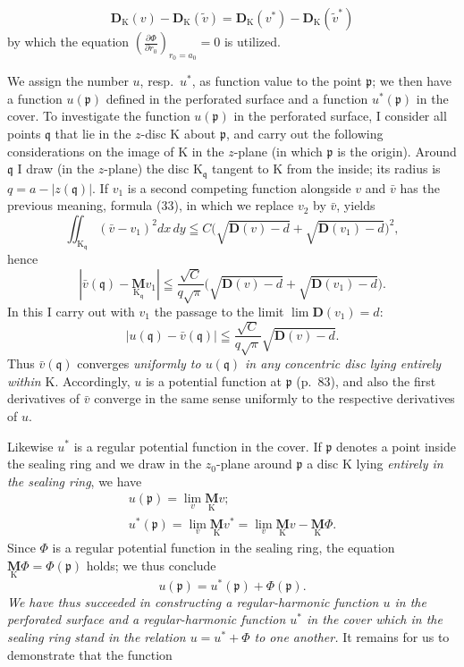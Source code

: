 \documentclass{article}
\begin{document}
\[ \mathbf{D}_{\mathrm{K}}(v) - \mathbf{D}_{\mathrm{K}}(\tilde{v}) = \mathbf{D}_{\mathrm{K}}(v^*) - \mathbf{D}_{\mathrm{K}}(\tilde{v}^*) \]
by which the equation $\left(\frac{\partial\Phi}{\partial r_0}\right)_{r_0 = a_0} = 0$ is utilized.

We assign the number $u$, resp.\ $u^*$, as function value to the point $\mathfrak{p}$; we then have a function $u(\mathfrak{p})$ defined in the perforated surface and a function $u^*(\mathfrak{p})$ in the cover. To investigate the function $u(\mathfrak{p})$ in the perforated surface, I consider all points $\mathfrak{q}$ that lie in the $z$-disc $\mathrm{K}$ about $\mathfrak{p}$, and carry out the following considerations on the image of $\mathrm{K}$ in the $z$-plane (in which $\mathfrak{p}$ is the origin). Around $\mathfrak{q}$ I draw (in the $z$-plane) the disc $\mathrm{K}_\mathfrak{q}$ tangent to $\mathrm{K}$ from the inside; its radius is $q = a - |z(\mathfrak{q})|$. If $v_1$ is a second competing function alongside $v$ and $\bar{v}$ has the previous meaning, formula (33), in which we replace $v_2$ by $\bar{v}$, yields
\[ \iint_{\mathrm{K}_\mathfrak{q}} (\bar{v} - v_1)^2 dx\,dy \leqq C \bigl( \sqrt{\mathbf{D}(v) - d} + \sqrt{\mathbf{D}(v_1) - d} \bigr)^2, \]
hence
\[ \left| \bar{v}(\mathfrak{q}) - \underset{\mathrm{K}_\mathfrak{q}}{\mathbf{M}} v_1 \right| \leqq \frac{\sqrt{C}}{q\sqrt{\pi}} \bigl( \sqrt{\mathbf{D}(v) - d} + \sqrt{\mathbf{D}(v_1) - d} \bigr). \]
In this I carry out with $v_1$ the passage to the limit $\lim\mathbf{D}(v_1) = d$:
\[ |u(\mathfrak{q}) - \bar{v}(\mathfrak{q})| \leqq \frac{\sqrt{C}}{q\sqrt{\pi}} \sqrt{\mathbf{D}(v) - d}. \]
Thus $\bar{v}(\mathfrak{q})$ converges \emph{uniformly to $u(\mathfrak{q})$ in any concentric disc lying entirely within $\mathrm{K}$}. Accordingly, $u$ is a potential function at $\mathfrak{p}$ (p.~83), and also the first derivatives of $\bar{v}$ converge in the same sense uniformly to the respective derivatives of $u$.

Likewise $u^*$ is a regular potential function in the cover. If $\mathfrak{p}$ denotes a point inside the sealing ring and we draw in the $z_0$-plane around $\mathfrak{p}$ a disc $\mathrm{K}$ lying \emph{entirely in the sealing ring}, we have
\[ \begin{gathered}
u(\mathfrak{p}) = \lim_v \underset{\mathrm{K}}{\mathbf{M}} v; \\
u^*(\mathfrak{p}) = \lim_v \underset{\mathrm{K}}{\mathbf{M}} v^* = \lim_v \underset{\mathrm{K}}{\mathbf{M}} v - \underset{\mathrm{K}}{\mathbf{M}} \Phi.
\end{gathered} \]
Since $\Phi$ is a regular potential function in the sealing ring, the equation $\underset{\mathrm{K}}{\mathbf{M}} \Phi = \Phi(\mathfrak{p})$ holds; we thus conclude
\[ u(\mathfrak{p}) = u^*(\mathfrak{p}) + \Phi(\mathfrak{p}). \]
\emph{We have thus succeeded in constructing a regular-harmonic function $u$ in the perforated surface and a regular-harmonic function $u^*$ in the cover which in the sealing ring stand in the relation $u = u^* + \Phi$ to one another.} It remains for us to demonstrate that the function
\end{document}
